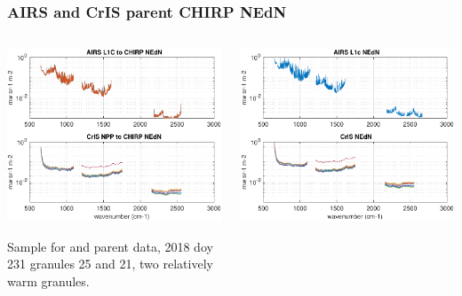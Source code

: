 \documentclass[9pt]{beamer}
\begin{document}
\begin{frame}
\frametitle{AIRS and CrIS parent CHIRP NEdN}
\begin{columns}[t]
\begin{column}{0.5\textwidth}  
  \begin{centering}
  \includegraphics[width=\textwidth]{figures/chirp_nedn_from_airs_and_cris.pdf}
  \end{centering}\vspace{3mm}

Sample {\chirp} {\nedn} for {\airs} and {\cris} parent data, 2018 doy
231 granules 25 and 21, two relatively warm granules.

\end{column}

\begin{column}{0.5\textwidth}
  \begin{centering}
  \includegraphics[width=\textwidth]{figures/sample_airs_and_cris_nedn.pdf}
  \end{centering}\vspace{3mm}


\end{column}
\end{columns}
\end{frame}
\end{document}
